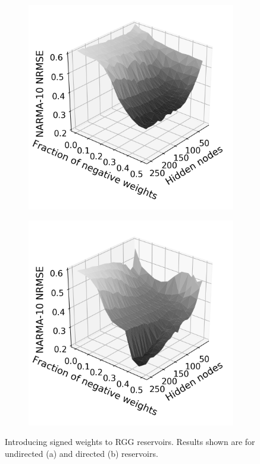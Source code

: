 \begin{figure}[t]
  \centering
  \begin{subfigure}{.49\textwidth}
    \centering
    \includegraphics[width=1.0\linewidth]{figures/perf-rest-undir.png}
    \caption{}
    \label{fig:perf-restore-a}
  \end{subfigure}
  \begin{subfigure}{.49\textwidth}
    \centering
    \includegraphics[width=1.0\linewidth]{figures/perf-rest-dir.png}
    \caption{}
    \label{fig:perf-restore-b}
  \end{subfigure}
  \caption{
    Introducing signed weights to RGG reservoirs. Results shown are for
undirected (a) and directed (b) reservoirs.
  }
  \label{fig:perf-restore}
\end{figure}

